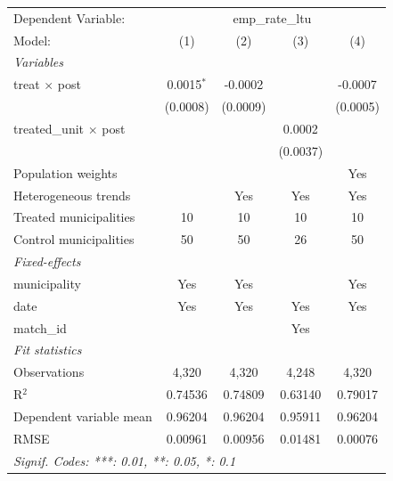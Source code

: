 
\begingroup
\centering
\begin{tabular}{lcccc}
   \tabularnewline \midrule \midrule
   Dependent Variable: & \multicolumn{4}{c}{emp\_rate\_ltu}\\
   Model:                        & (1)          & (2)      & (3)      & (4)\\  
   \midrule
   \emph{Variables}\\
   treat $\times$ post           & 0.0015$^{*}$ & -0.0002  &          & -0.0007\\   
                                 & (0.0008)     & (0.0009) &          & (0.0005)\\   
   treated\_unit $\times$ post   &              &          & 0.0002   &   \\   
                                 &              &          & (0.0037) &   \\   
   Population weights            &              &          &          & Yes\\  
   Heterogeneous trends          &              & Yes      & Yes      & Yes\\  
   Treated municipalities        & 10           & 10       & 10       & 10\\  
   Control municipalities        & 50           & 50       & 26       & 50\\  
   \midrule
   \emph{Fixed-effects}\\
   municipality                  & Yes          & Yes      &          & Yes\\  
   date                          & Yes          & Yes      & Yes      & Yes\\  
   match\_id                     &              &          & Yes      & \\  
   \midrule
   \emph{Fit statistics}\\
   Observations                  & 4,320        & 4,320    & 4,248    & 4,320\\  
   R$^2$                         & 0.74536      & 0.74809  & 0.63140  & 0.79017\\  
   Dependent variable mean       & 0.96204      & 0.96204  & 0.95911  & 0.96204\\  
   RMSE                          & 0.00961      & 0.00956  & 0.01481  & 0.00076\\  
   \midrule \midrule
   \multicolumn{5}{l}{\emph{Signif. Codes: ***: 0.01, **: 0.05, *: 0.1}}\\
\end{tabular}
\par\endgroup


